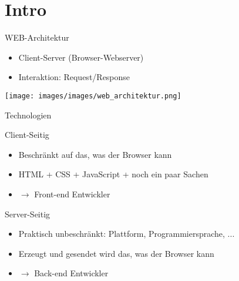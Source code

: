 \section{Intro}

\begin{definition}{WEB-Architektur}
    \begin{itemize}
        \item Client-Server (Browser-Webserver)
        \item Interaktion: Request/Response
    \end{itemize}
    \texttt{[image: images/images/web\_architektur.png]}
\end{definition}

\begin{concept}{Technologien}
    
    Client-Seitig
    \begin{itemize}
        \item Beschränkt auf das, was der Browser kann
        \item HTML + CSS + JavaScript + noch ein paar Sachen
        \item $\rightarrow$ Front-end Entwickler
    \end{itemize}

    Server-Seitig
    \begin{itemize}
        \item Praktisch unbeschränkt: Plattform, Programmiersprache, ...
        \item Erzeugt und gesendet wird das, was der Browser kann
        \item $\rightarrow$ Back-end Entwickler
    \end{itemize}
\end{concept}